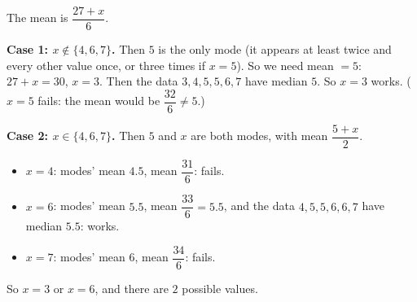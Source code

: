 The mean is $\dfrac{27+x}{6}$.

\textbf{Case 1: $x\notin\{4,6,7\}$.} Then $5$ is the only mode (it appears at least twice and every other value once, or three times if $x=5$). So we need mean $=5$: $27+x=30$, $x=3$. Then the data $3,4,5,5,6,7$ have median $5$. So $x=3$ works. ($x=5$ fails: the mean would be $\dfrac{32}{6}\ne5$.)

\textbf{Case 2: $x\in\{4,6,7\}$.} Then $5$ and $x$ are both modes, with mean $\dfrac{5+x}{2}$.
\begin{itemize}
\item $x=4$: modes' mean $4.5$, mean $\dfrac{31}{6}$: fails.
\item $x=6$: modes' mean $5.5$, mean $\dfrac{33}{6}=5.5$, and the data $4,5,5,6,6,7$ have median $5.5$: works.
\item $x=7$: modes' mean $6$, mean $\dfrac{34}{6}$: fails.
\end{itemize}
So $x=3$ or $x=6$, and there are $\boxed{2}$ possible values.
